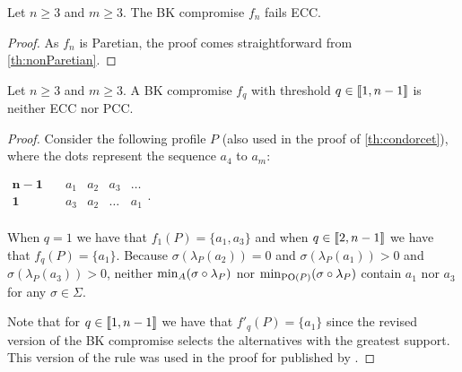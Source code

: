 \begin{theorem}
	\label{th:FBfailsECC}
	Let $n\geq 3$ and $m\geq 3.$ The BK compromise $f_{n}$ fails ECC. 
\end{theorem}
\begin{proof}
	As $f_{n}$ is Paretian, the proof comes straightforward from \cref{th:nonParetian}.
\end{proof}

\begin{theorem}
	\label{th:BKthreshold}
	Let $n\geq 3$ and $m\geq 3.$ A BK compromise $f_{q}$ with threshold $q \in \llbracket1, n-1\rrbracket$ is neither ECC nor PCC.
\end{theorem}
\begin{proof}
	Consider the following profile $P$ (also used in the proof of \cref{th:condorcet}), where the dots represent the sequence $a_4$ to $a_m$:
	\begin{center}
		$
		\begin{array}{cccccc}
			\mathbf{n-1} \quad &a_1&a_2&a_3&\dots\\
			\mathbf{1} \quad &a_3&a_2&\dots&a_1\\
		\end{array}
		$\quad.
	\end{center}
	When $q=1$ we have that $f_{1}(P)=\{a_1,a_3\}$ and when $q \in \llbracket2, n-1\rrbracket$ we have that $f_{q}(P)=\{a_1\}$. Because $\sigma(\lambda_P(a_2)) = 0$ and $\sigma(\lambda_P(a_1)) > 0$ and $\sigma(\lambda_P(a_3)) > 0$, neither $\musigma$ nor $\mustar$ contain $a_1$ nor $a_3$ for any $\sigma \in \Sigma$. 

	Note that for $q \in \llbracket1, n-1\rrbracket$ we have that $f'_{q}(P)=\{a_1\}$ since the revised version of the \acs{BK} compromise selects the alternatives with the greatest support. This version of the rule was used in the proof for  published by \citet{Cailloux2022}. 
\end{proof}

